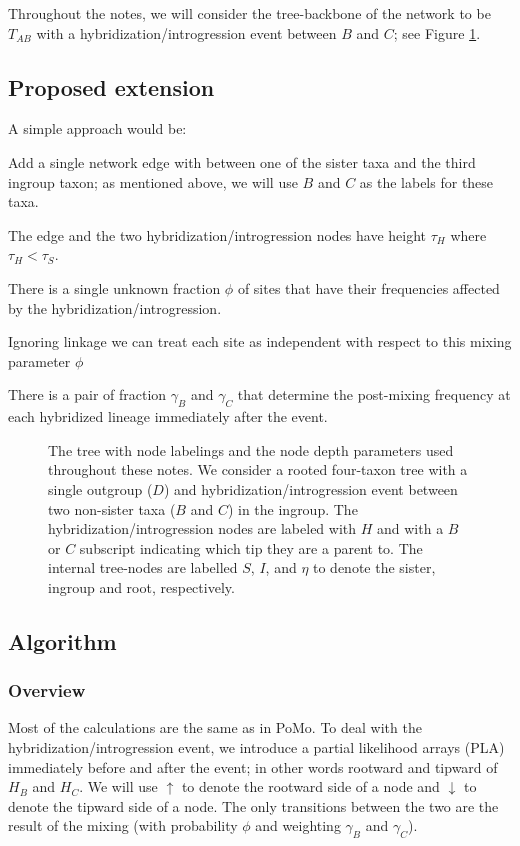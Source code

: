 \documentclass{article}
\begin{document}
Throughout the notes, we will consider the tree-backbone of the network to be $T_{AB}$ with a hybridization/introgression event between $B$ and $C$; see Figure \ref{fig:tree}.

\subsection{Proposed extension}
A simple approach would be:
\begin{compactitem}
    \item Add a single network edge with between one of the sister taxa and the third ingroup taxon; as mentioned above, we will use $B$ and $C$ as the labels for these taxa.
    \item The edge and the two hybridization/introgression nodes have height $\tau_H$ where $\tau_H < \tau_S$.
    \item There is a single unknown fraction $\phi$ of sites that have their frequencies affected by the hybridization/introgression. 
    \item Ignoring linkage we can treat each site as independent with respect to this mixing parameter $\phi$
    \item There is a pair of fraction $\gamma_B$ and $\gamma_C$ that determine the post-mixing frequency at each hybridized lineage immediately after the event.
\end{compactitem}

\begin{figure}[htp]
\centering
\scalebox{0.3}{}
\caption{The tree with node labelings and  the node depth parameters used throughout these notes. We consider a rooted four-taxon tree with a single outgroup ($D$) and hybridization/introgression event between two non-sister taxa ($B$ and $C$) in the ingroup. The hybridization/introgression nodes are labeled with $H$ and with a $B$ or $C$ subscript indicating which tip they are a parent to. The internal tree-nodes are labelled $S$, $I$, and $\eta$ to denote the sister, ingroup and root, respectively.}
\label{fig:tree}
\end{figure}

\subsection{Algorithm}
\subsubsection{Overview}
Most of the calculations are the same as in PoMo.
To deal with the hybridization/introgression event, we introduce a partial likelihood arrays (PLA) immediately before and after the event; in other words rootward and tipward of $H_B$ and $H_C$.
We will use $\uparrow$ to denote the rootward side of a node and $\downarrow$ to denote the tipward side of a node.
The only transitions between the two are the result of the mixing (with probability $\phi$ and weighting $\gamma_B$ and $\gamma_C$).
\end{document}
